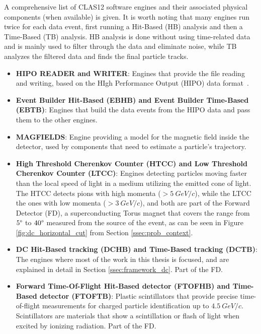 A comprehensive list of CLAS12 software engines and their associated physical components (when available) is given.
It is worth noting that many engines run twice for each data event, first running a Hit-Based (HB) analysis and then a Time-Based (TB) analysis.
HB analysis is done without using time-related data and is mainly used to filter through the data and eliminate noise, while TB analyzes the filtered data and finds the final particle tracks.
    \begin{itemize}
        \item \textbf{HIPO READER and WRITER}: Engines that provide the file reading and writing, based on the HIgh Performance Output (HIPO) data format~\cite{gavalian2019data}. %
        
        \item \textbf{Event Builder Hit-Based (EBHB) and Event Builder Time-Based (EBTB)}: Engines that build the data events from the HIPO data and pass them to the other engines.
        
        \item \textbf{MAGFIELDS}: Engine providing a model for the magnetic field inside the detector, used by components that need to estimate a particle's trajectory. %
        
        \item \textbf{High Threshold Cherenkov Counter (HTCC) and Low Threshold Cherenkov Counter (LTCC)}: Engines detecting particles moving faster than the local speed of light in a medium utilizing the emitted cone of light.
        The HTCC detects pions with high momenta ($>5~GeV/c$), while the LTCC the ones with low momenta ($>3~GeV/c$), and both are part of the Forward Detector (FD), a superconducting Torus magnet that covers the range from $5\degree$ to $40\degree$ measured from the source of the event, as can be seen in Figure \ref{fig:dc_horizontal_cut} from Section \ref{ssec:prob_context}.
        
        \item \textbf{DC Hit-Based tracking (DCHB) and Time-Based tracking (DCTB)}: The engines where most of the work in this thesis is focused, and are explained in detail in Section \ref{ssec:framework_dc}.
        Part of the FD.
        
        \item \textbf{Forward Time-Of-Flight Hit-Based detector (FTOFHB) and Time-Based detector (FTOFTB)}: Plastic scintillators that provide precise time-of-flight measurements for charged particle identification up to $4.5~GeV/c$.
        Scintillators are materials that show a scintillation or flash of light when excited by ionizing radiation.
        Part of the FD.
        

\end{itemize}
